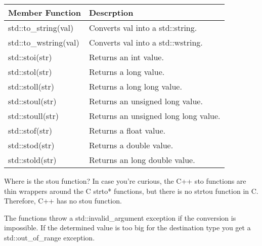\begin{longtable}[c]{|l|l|}
\hline
\textbf{Member Function} & \textbf{Descrption}                  \\ \hline
\endfirsthead
%
\endhead
%
std::to\_string(val)     & Converts val into a std::string.     \\ \hline
std::to\_wstring(val)    & Converts val into a std::wstring.    \\ \hline
std::stoi(str)           & Returns an int value.                \\ \hline
std::stol(str)           & Returns a long value.                \\ \hline
std::stoll(str)          & Returns a long long value.           \\ \hline
std::stoul(str)          & Returns an unsigned long value.      \\ \hline
std::stoull(str)         & Returns an unsigned long long value. \\ \hline
std::stof(str)           & Returns a float value.               \\ \hline
std::stod(str)           & Returns a double value.              \\ \hline
std::stold(str)          & Returns an long double value.        \\ \hline
\end{longtable}


\begin{myNotic}{Where is the stou function?}
In case you’re curious, the C++ sto functions are thin wrappers around the C strto* functions, but there is no strtou function in C. Therefore, C++ has no stou function.
\end{myNotic}

The functions throw a std::invalid\_argument exception if the conversion is impossible. If the determined value is too big for the destination type you get a std::out\_of\_range exception.


